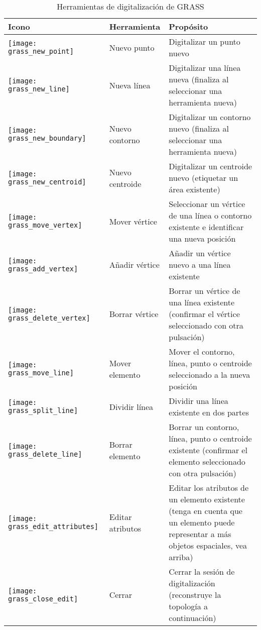 \begin{table}[h]
\centering
\caption{Herramientas de digitalización de GRASS}\label{tab:grass_tools}\medskip
 \begin{tabular}{|l|l|p{5in}|}
 \hline \textbf{Icono} & \textbf{Herramienta} & \textbf{Propósito} \\
\hline \texttt{[image: grass\_new\_point]} & Nuevo punto & Digitalizar un punto nuevo \\
\hline \texttt{[image: grass\_new\_line]} & Nueva línea &  Digitalizar una línea nueva (finaliza al seleccionar una herramienta nueva) \\
\hline \texttt{[image: grass\_new\_boundary]} & Nuevo contorno & Digitalizar un contorno nuevo (finaliza al seleccionar una herramienta nueva)\\
\hline \texttt{[image: grass\_new\_centroid]} & Nuevo centroide & Digitalizar un centroide nuevo (etiquetar un área existente)\\
\hline \texttt{[image: grass\_move\_vertex]} & Mover vértice & Seleccionar un vértice de una línea o contorno existente e identificar una nueva posición\\
\hline \texttt{[image: grass\_add\_vertex]} & Añadir vértice & Añadir un vértice nuevo a una línea existente\\
\hline \texttt{[image: grass\_delete\_vertex]} & Borrar vértice & Borrar un vértice de una línea existente (confirmar el vértice seleccionado con otra pulsación)\\
\hline \texttt{[image: grass\_move\_line]} & Mover elemento & Mover el contorno, línea, punto o centroide seleccionado a la nueva posición\\
\hline \texttt{[image: grass\_split\_line]} & Dividir línea & Dividir una línea existente en dos partes\\
\hline \texttt{[image: grass\_delete\_line]} & Borrar elemento & Borrar un contorno, línea, punto o centroide existente (confirmar el elemento seleccionado con otra pulsación)\\
\hline \texttt{[image: grass\_edit\_attributes]} & Editar atributos & Editar los atributos de un elemento existente (tenga en cuenta que un elemento puede representar a más objetos espaciales, vea arriba)\\
\hline \texttt{[image: grass\_close\_edit]} & Cerrar & Cerrar la sesión de digitalización (reconstruye la topología a continuación)\\
\hline
\end{tabular}
\end{table}

